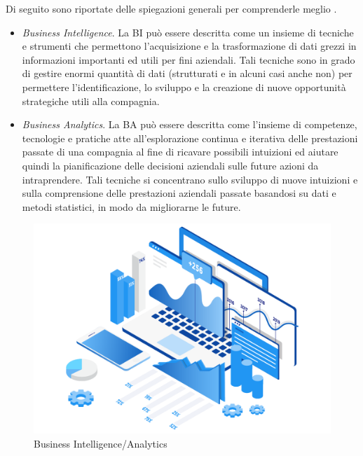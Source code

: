 Di seguito sono riportate delle spiegazioni generali per comprenderle meglio \cite{academiaedu_bi_and_ba}.

\begin{itemize}
    \item \textit{Business Intelligence}. La BI può essere descritta come un insieme di tecniche e strumenti che permettono l'acquisizione e la trasformazione di dati grezzi in informazioni importanti ed utili per fini aziendali. Tali tecniche sono in grado di gestire enormi quantità di dati (strutturati e in alcuni casi anche non) per permettere l'identificazione, lo sviluppo e la creazione di nuove opportunità strategiche utili alla compagnia.
    \item \textit{Business Analytics}. La BA può essere descritta come l'insieme di competenze, tecnologie e pratiche atte all'esplorazione continua e iterativa delle prestazioni passate di una compagnia al fine di ricavare possibili intuizioni ed aiutare quindi la pianificazione delle decisioni aziendali sulle future azioni da intraprendere. Tali tecniche si concentrano sullo sviluppo di nuove intuizioni e sulla comprensione delle prestazioni aziendali passate basandosi su dati e metodi statistici, in modo da migliorarne le future.
\end{itemize}

\begin{figure}[H]
    \centering
    \includegraphics[width=0.75\linewidth]{figure/capitolo_2/Business Intelligence - Business Analytics.pdf}
    \caption{Business Intelligence/Analytics}
    \label{fig:Business Intelligence - Business Analytics}
\end{figure}